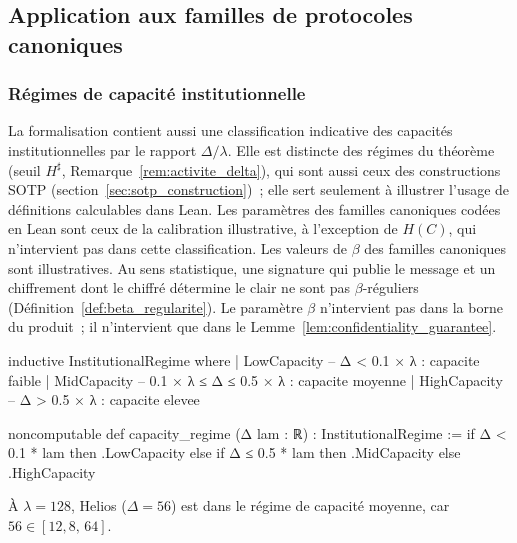\subsection{Application aux familles de protocoles canoniques}
\label{subsec:application_familles_canoniques}
\begin{sloppypar}
\subsubsection{R\'egimes de capacit\'e institutionnelle}
\label{subsubsec:regimes_capacite_lean4}

La formalisation contient aussi une classification indicative des
capacit\'es institutionnelles par le rapport $\Delta/\lambda$. Elle est distincte
des r\'egimes du th\'eor\`eme (seuil $H^\sharp$, Remarque~\ref{rem:activite_delta}),
qui sont aussi ceux des constructions SOTP (section~\ref{sec:sotp_construction})~; elle
sert seulement \`a illustrer l'usage de d\'efinitions calculables dans Lean. Les
param\`etres des familles canoniques cod\'ees en Lean sont ceux de la
calibration illustrative, \`a l'exception de $H(C)$, qui n'intervient pas dans
cette classification. Les valeurs de $\beta$ des familles canoniques sont illustratives. Au
sens statistique, une signature qui publie le message et un chiffrement dont le chiffr\'e
d\'etermine le clair ne sont pas $\beta$-r\'eguliers (D\'efinition~\ref{def:beta_regularite}). Le
param\`etre $\beta$ n'intervient pas dans la borne du produit~; il n'intervient que dans le
Lemme~\ref{lem:confidentiality_guarantee}.

\begin{leancode}[caption={Classification des r\'egimes institutionnels en Lean4}, label={lst:lean4_capacity_regime}]
inductive InstitutionalRegime where
  | LowCapacity    -- Δ < 0.1 × λ : capacite faible
  | MidCapacity    -- 0.1 × λ ≤ Δ ≤ 0.5 × λ : capacite moyenne
  | HighCapacity   -- Δ > 0.5 × λ : capacite elevee

noncomputable def capacity_regime (Δ lam : ℝ) : InstitutionalRegime :=
  if Δ < 0.1 * lam then .LowCapacity
  else if Δ ≤ 0.5 * lam then .MidCapacity
  else .HighCapacity
\end{leancode}

\begin{theorem}\label{thm:regime_helios}
\`A $\lambda = 128$, Helios ($\Delta = 56$) est
dans le r\'egime de capacit\'e moyenne, car $56 \in [12{,}8,\, 64]$.
\end{theorem}


\end{sloppypar}
